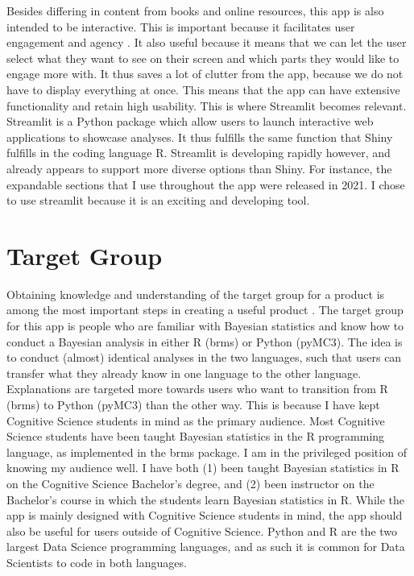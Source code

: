 \documentclass[12pt]{article}
\begin{document}
Besides differing in content from books and online resources, this app is also intended
to be interactive. This is important because it facilitates user engagement and
agency \autocite{janlert2017meaning}.
It also useful because it means that we can let the user select what they want to see on
their screen and which parts they would like to engage more with. It thus saves a lot of
clutter from the app, because we do not have to display everything at once.
This means that the app can have extensive functionality and retain high
usability.
This is where Streamlit becomes relevant. Streamlit is a Python package which allow users
to launch interactive web applications to showcase analyses. It thus fulfills the same function
that Shiny fulfills in the coding language R. Streamlit is developing rapidly however,
and already appears to support more diverse options than Shiny. For instance,
the expandable sections that I use throughout the app were released in 2021. I chose to
use streamlit because it is an exciting and developing tool.

\section{Target Group}
Obtaining knowledge and understanding of the target group for a product is among the
most important steps in creating a useful product
\autocite[13]{mills1992macintosh}.
The target group for this app is people who are familiar with Bayesian statistics and know
how to conduct a Bayesian analysis in either R (brms) or Python (pyMC3). The idea is to
conduct (almost) identical analyses in the two languages, such that users can
transfer what they already know in one language to the other language.
Explanations are targeted more towards users who want to transition from R (brms)
to Python (pyMC3) than the other way. This is because I have kept Cognitive Science students
in mind as the primary audience. Most Cognitive Science students have been
taught Bayesian statistics in the R programming language, as implemented in the
brms package. I am in the privileged position of knowing my audience well. I
have both (1) been taught Bayesian statistics in R on the Cognitive Science
Bachelor's degree, and (2) been instructor on the Bachelor's course in which
the students learn Bayesian statistics in R.
While the app is mainly designed with Cognitive Science students in mind,
the app should also be useful for users outside of Cognitive Science.
Python and R are the two largest Data Science programming
languages, and as such it is common for Data Scientists to code in both
languages.
\end{document}
